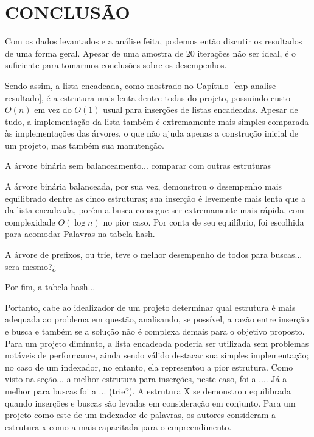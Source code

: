 \chapter*{CONCLUSÃO}\label{cap-conclusao}

Com os dados levantados e a análise feita, podemos então discutir os resultados de uma forma geral. Apesar de uma amostra de 20 iterações não ser ideal, é o suficiente para tomarmos conclusões sobre os desempenhos.

Sendo assim, a lista encadeada, como mostrado no Capítulo~\ref{cap-analise-resultado}, é a estrutura mais lenta dentre todas do projeto, possuindo custo $O(n)$ em vez do $O(1)$ usual para inserções de listas encadeadas. Apesar de tudo, a implementação da lista também é extremamente mais simples comparada às implementações das árvores, o que não ajuda apenas a construção inicial de um projeto, mas também sua manutenção.

A árvore binária sem balanceamento... comparar com outras estruturas

A árvore binária balanceada, por sua vez, demonstrou o desempenho mais equilibrado dentre as cinco estruturas; sua inserção é levemente mais lenta que a da lista encadeada, porém a busca consegue ser extremamente mais rápida, com complexidade $O(\log{n})$ no pior caso. Por conta de seu equilíbrio, foi escolhida para acomodar Palavras na tabela hash.

A árvore de prefixos, ou trie, teve o melhor desempenho de todos para buscas... sera mesmo?¿

Por fim, a tabela hash...

Portanto, cabe ao idealizador de um projeto determinar qual estrutura é mais adequada ao problema em questão, analisando, se possível, a razão entre inserção e busca e também se a solução não é complexa demais para o objetivo proposto. Para um projeto diminuto, a lista encadeada poderia ser utilizada sem problemas notáveis de performance, ainda sendo válido destacar sua simples implementação; no caso de um indexador, no entanto, ela representou a pior estrutura. Como visto na seção... a melhor estrutura para inserções, neste caso, foi a .... Já a melhor para buscas foi a ... (trie?). A estrutura X se demonstrou equilibrada quando inserções e buscas são levadas em consideração em conjunto. Para um projeto como este de um indexador de palavras, os autores consideram a estrutura x como a mais capacitada para o empreendimento.

\lipsum[10]